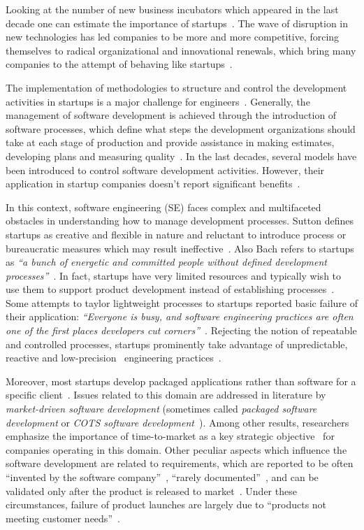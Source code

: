 \documentclass[10pt,journal,letterpaper,compsoc]{IEEEtran}
\begin{document}
Looking at the number of new business incubators which appeared in the last
decade one can estimate the importance of startups~\cite{Grimaldi2005}. The wave
of disruption in new technologies has led companies to be more and more
competitive, forcing themselves to radical organizational and innovational
renewals, which bring many companies to the attempt of behaving like 
startups~\cite{Christensen1997}.

The implementation of methodologies to structure and control the development
activities in startups is a major challenge for engineers~\cite{Coleman2008}.
Generally, the management of software development is achieved through the
introduction of software processes, which define what steps the development
organizations should take at each stage of production and provide assistance in
making estimates, developing plans and measuring quality~\cite{Chroust1996}. In
the last decades, several models have been introduced to control software
development activities. However, their application in startup companies doesn't
report significant benefits~\cite{Coleman2008a, Coleman2008, Sutton2000}.

In this context, software engineering (SE) faces complex and multifaceted
obstacles in understanding how to manage development processes. Sutton defines
startups as creative and flexible in nature and reluctant to introduce process
or bureaucratic measures which may result ineffective~\cite{Sutton2000}. Also
Bach refers to startups as \textit{``a bunch of energetic and committed people
without defined development processes''}~\cite{Bach1998}. In fact, startups have
very limited resources and typically wish to use them to support product
development instead of establishing processes~\cite{Coleman2008, Heitlager2007}.
Some attempts to taylor lightweight processes to startups reported basic failure
of their application: \textit{``Everyone is busy, and software engineering
practices are often one of the first places developers cut 
corners''}~\cite{Martin2007}. Rejecting the notion of repeatable and controlled 
processes, startups prominently take advantage of unpredictable, reactive and 
low-precision~\cite{surviving-os-cockburn} engineering 
practices~\cite{Sutton2000,Tanabian2005, Chorev2006, Kakati2003}.

Moreover, most startups develop packaged applications rather than software for
a specific client~\cite{genome2012}. Issues related to this domain are addressed
in literature by \textit{market-driven software development}
(sometimes called \textit{packaged software development} or \textit{COTS
software development}~\cite{Alves2006}). Among other results, researchers
emphasize the importance of time-to-market as a key strategic 
objective~\cite{dagMDR,sawyer99} for companies operating in this domain. Other 
peculiar aspects which influence the software development are related to 
requirements, which are reported to be often ``invented by the software 
company''~\cite{512553}, ``rarely documented''~\cite{Karlsson02challengesin}, 
and can be validated only after the product is released to 
market~\cite{dahl2003,Keil:1995}. Under these circumstances, failure of product
launches are largely due to ``products not meeting customer 
needs''~\cite{Alves2006}.
\end{document}
